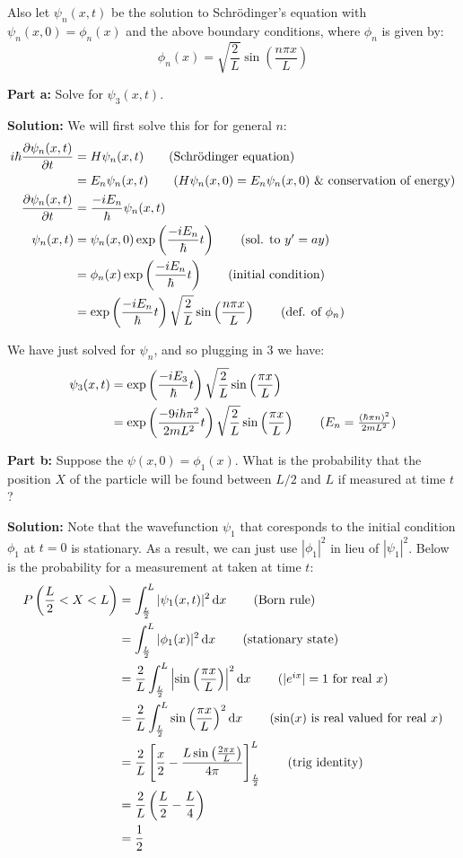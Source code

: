 \documentclass{article}
\renewcommand{\eval}[3]{\left[#1\right]_{#2}^{#3}}
\begin{document}
Also let $\psi_n(x,t)$ be the solution to Schrödinger's equation with $\psi_n(x,0)=\phi_n(x)$ and the above boundary conditions, where $\phi_n$ is given by:
$$\phi_n(x)=\sqrt{\frac{2}{L}}\sin\left(\frac{n\pi x}{L}\right)$$
\bigskip

\noindent\textbf{Part a:} Solve for $\psi_3(x,t)$.
\bigskip

\noindent\textbf{Solution:} We will first solve this for for general $n$:
\begin{align*}
    i\hbar\pdv{\psi_n(x,t)}{t}&=H\psi_n(x,t)\tag{Schrödinger equation}\\
    &=E_n\psi_n(x,t)\tag{$H\psi_n(x,0)=E_n\psi_n(x,0)$ \& conservation of energy}\\
    \pdv{\psi_n(x,t)}{t}&=\frac{-iE_n}{\hbar}\psi_n(x,t)\\
    \psi_n(x,t)&=\psi_n(x,0)\exp\left(\frac{-iE_n}{\hbar}t\right)\tag{sol. to $y'=ay$}\\
    &=\phi_n(x)\exp\left(\frac{-iE_n}{\hbar}t\right)\tag{initial condition}\\
    &=\exp\left(\frac{-iE_n}{\hbar}t\right)\sqrt{\frac{2}{L}}\sin\left(\frac{n\pi x}{L}\right)\tag{def. of $\phi_n$}
\end{align*}

We have just solved for $\psi_n$, and so plugging in 3 we have:
\begin{align*}
    \psi_3(x,t)&=\exp\left(\frac{-iE_3}{\hbar}t\right)\sqrt{\frac{2}{L}}\sin\left(\frac{\pi x}{L}\right)\\
    &=\exp\left(\frac{-9i\hbar\pi^2}{2mL^2}t\right)\sqrt{\frac{2}{L}}\sin\left(\frac{\pi x}{L}\right)\tag{$E_n=\frac{(\hbar\pi n)^2}{2mL^2}$}\\
\end{align*}
\bigskip
\newpage

\noindent\textbf{Part b:} Suppose the $\psi(x,0)=\phi_1(x)$. What is the probability that the position $X$ of the particle will be found between $L/2$ and $L$ if measured at time $t$?
\bigskip

\noindent\textbf{Solution:} Note that the wavefunction $\psi_1$ that coresponds to the initial condition $\phi_1$ at $t=0$ is stationary. As a result, we can just use $|\phi_1|^2$ in lieu of $|\psi_1|^2$. Below is the probability for a measurement at taken at time $t$:
\begin{align*}
    P\left(\frac{L}{2}<X<L\right)&=\int_\frac{L}{2}^{L}|\psi_1(x,t)|^2\dd{x}\tag{Born rule}\\
    &=\int_\frac{L}{2}^{L}|\phi_1(x)|^2\dd{x}\tag{stationary state}\\
    &=\frac{2}{L}\int_\frac{L}{2}^{L}\left|\sin\left(\frac{\pi x}{L}\right)\right|^2\dd{x}\tag{$|e^{ix}|=1$ for real $x$}\\
    &=\frac{2}{L}\int_\frac{L}{2}^{L}\sin\left(\frac{\pi x}{L}\right)^2\dd{x}\tag{$\sin(x)$ is real valued for real $x$}\\
    &=\frac{2}{L}\eval{\frac{x}{2}-\frac{L\sin\left(\frac{2\pi x}{L}\right)}{4\pi}}{\frac{L}{2}}{L}\tag{trig identity}\\
    &=\frac{2}{L}\left(\frac{L}{2}-\frac{L}{4}\right)\\
    &=\frac{1}{2}
\end{align*}
\bigskip
\end{document}
